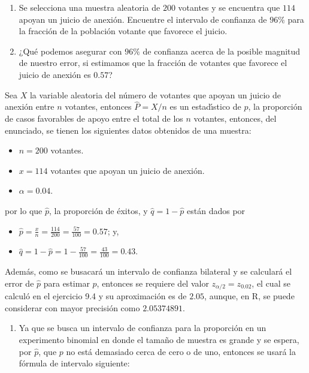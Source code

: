 \begin{enunciado}
 $\phantom{0}$
 \begin{enumerate}
  \item Se selecciona una muestra aleatoria de $200$ votantes y se encuentra que $114$ apoyan un juicio de anexi\'on. Encuentre el intervalo de confianza de $96\%$ para la fracci\'on de la poblaci\'on votante que favorece el juicio.
  
  \item ¿Qu\'e podemos asegurar con $96\%$ de confianza acerca de la posible magnitud de nuestro error, si estimamos que la fracci\'on de votantes que favorece el juicio de anexi\'on es $0.57$?
 \end{enumerate}
\end{enunciado}

\begin{solucion}
 Sea $X$ la variable aleatoria del n\'umero de votantes que apoyan un juicio de anexi\'on entre $n$ votantes, entonces $\widehat{P}=X/n$ es un estad\'{\i}stico de $p$, la proporci\'on de casos favorables de apoyo entre el total de los $n$ votantes, entonces, del enunciado, se tienen los siguientes datos obtenidos de una muestra:
 \begin{itemize}
  \item $n = 200$ votantes.
  \item $x = 114$ votantes que apoyan un juicio de anexi\'on.
  \item $\alpha=0.04$.
 \end{itemize}
 por lo que $\hat{p}$, la proporci\'on de \'exitos, y $\hat{q}=1-\hat{p}$ est\'an dados por
 \begin{itemize}
  \item $\hat{p} = \frac{x}{n} = \frac{114}{200} = \frac{57}{100} = 0.57$; y,
  \item $\hat{q} = 1-\hat{p} = 1-\frac{57}{100} = \frac{43}{100} = 0.43$.
 \end{itemize}
 Adem\'as, como se busacar\'a un intervalo de confianza bilateral y se calcular\'a el error de $\hat{p}$ para estimar $p$, entonces se requiere del valor $z_{\alpha/2} = z_{0.02}$, el cual se calcul\'o en el ejercicio 9.4 y su aproximaci\'on es de $2.05$, aunque, en R, se puede considerar con mayor precisi\'on como $2.05374891$.
 \begin{enumerate}
  \item Ya que se busca un intervalo de confianza para la proporci\'on en un experimento binomial en donde el tama\~no de muestra es grande y se espera, por $\hat{p}$, que $p$ no est\'a demasiado cerca de cero o de uno, entonces se usar\'a la f\'ormula de intervalo siguiente:

\end{enumerate}
\end{solucion}
